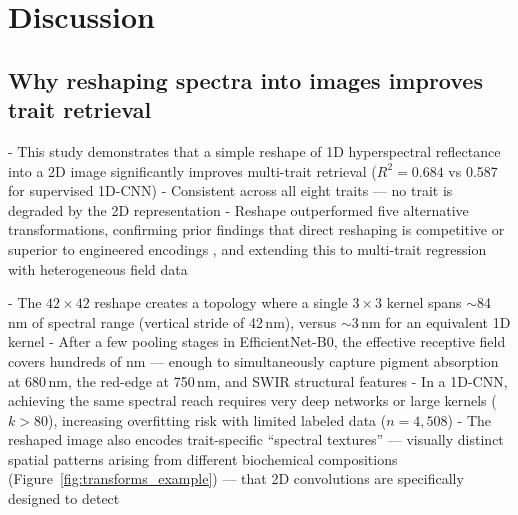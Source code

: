 \section{Discussion}
\label{sec:discussion}

\subsection{Why reshaping spectra into images improves trait retrieval}
\label{sec:disc_reshape}

 - This study demonstrates that a simple reshape of 1D
   hyperspectral reflectance into a 2D image significantly
   improves multi-trait retrieval ($R^2 = 0.684$ vs 0.587
   for supervised 1D-CNN)
 - Consistent across all eight traits --- no trait is
   degraded by the 2D representation
 - Reshape outperformed five alternative transformations,
   confirming prior findings that direct reshaping is
   competitive or superior to engineered encodings
   \citep{hennessy2022reshaping, deev2024spectrum,
   sharma2019deepinsight}, and extending this to
   multi-trait regression with heterogeneous field data

 - The $42 \times 42$ reshape creates a topology where a
   single $3 \times 3$ kernel spans $\sim$84\,nm of
   spectral range (vertical stride of 42\,nm), versus
   $\sim$3\,nm for an equivalent 1D kernel
 - After a few pooling stages in EfficientNet-B0, the
   effective receptive field covers hundreds of nm ---
   enough to simultaneously capture pigment absorption
   at 680\,nm, the red-edge at 750\,nm, and SWIR
   structural features
 - In a 1D-CNN, achieving the same spectral reach
   requires very deep networks or large kernels ($k > 80$),
   increasing overfitting risk with limited labeled data
   ($n = 4{,}508$) \citep{cherif2023spectra}
 - The reshaped image also encodes trait-specific
   ``spectral textures'' --- visually distinct spatial
   patterns arising from different biochemical
   compositions (Figure~\ref{fig:transforms_example}) ---
   that 2D convolutions are specifically designed to
   detect

